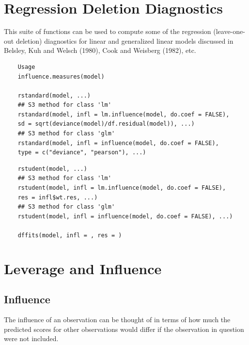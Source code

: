 \documentclass[residuals.tex]{subfiles}
\begin{document}
\Large

\section{Regression Deletion Diagnostics}

This suite of functions can be used to compute some of the regression (leave-one-out deletion) diagnostics for linear and generalized linear models discussed in Belsley, Kuh and Welsch (1980), Cook and Weisberg (1982), etc. 

\begin{framed}
	\begin{verbatim}
	Usage
	influence.measures(model)
	
	rstandard(model, ...)
	## S3 method for class 'lm'
	rstandard(model, infl = lm.influence(model, do.coef = FALSE),
	sd = sqrt(deviance(model)/df.residual(model)), ...)
	## S3 method for class 'glm'
	rstandard(model, infl = influence(model, do.coef = FALSE),
	type = c("deviance", "pearson"), ...)
	\end{verbatim}
\end{framed}

\begin{framed}
	\begin{verbatim}
	rstudent(model, ...)
	## S3 method for class 'lm'
	rstudent(model, infl = lm.influence(model, do.coef = FALSE),
	res = infl$wt.res, ...)
	## S3 method for class 'glm'
	rstudent(model, infl = influence(model, do.coef = FALSE), ...)
	
	dffits(model, infl = , res = )
	\end{verbatim}
\end{framed}
\newpage
	\section{Leverage and Influence}
	\subsection{Influence}
	The influence of an observation can be thought of in terms of how much the predicted scores for other observations would differ if the observation in question were not included. 
	
	
\end{document}
